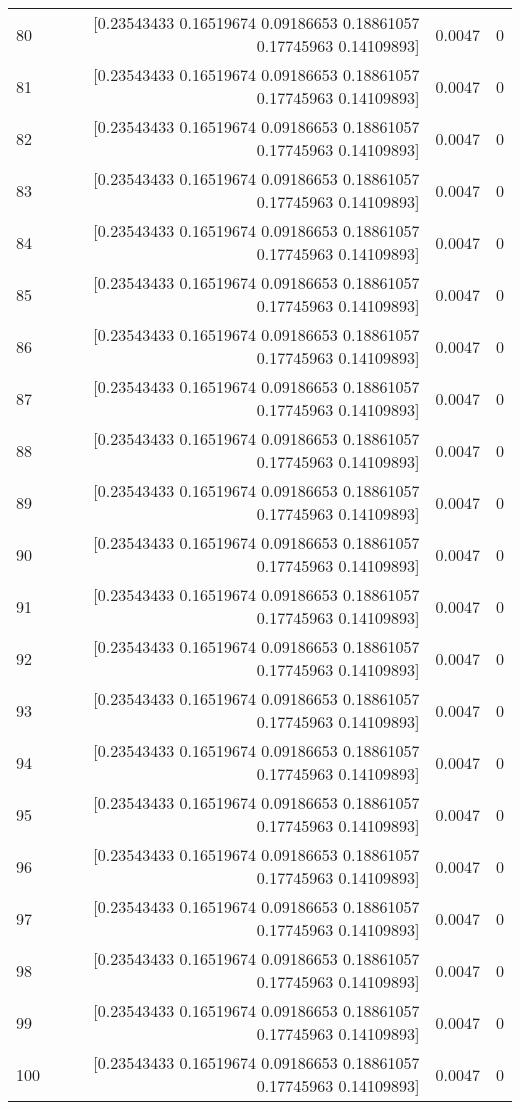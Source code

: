 \begin{longtable}{lrrr}
80 & [0.23543433 0.16519674 0.09186653 0.18861057 0.17745963 0.14109893] & 0.0047 & 0 \\
81 & [0.23543433 0.16519674 0.09186653 0.18861057 0.17745963 0.14109893] & 0.0047 & 0 \\
82 & [0.23543433 0.16519674 0.09186653 0.18861057 0.17745963 0.14109893] & 0.0047 & 0 \\
83 & [0.23543433 0.16519674 0.09186653 0.18861057 0.17745963 0.14109893] & 0.0047 & 0 \\
84 & [0.23543433 0.16519674 0.09186653 0.18861057 0.17745963 0.14109893] & 0.0047 & 0 \\
85 & [0.23543433 0.16519674 0.09186653 0.18861057 0.17745963 0.14109893] & 0.0047 & 0 \\
86 & [0.23543433 0.16519674 0.09186653 0.18861057 0.17745963 0.14109893] & 0.0047 & 0 \\
87 & [0.23543433 0.16519674 0.09186653 0.18861057 0.17745963 0.14109893] & 0.0047 & 0 \\
88 & [0.23543433 0.16519674 0.09186653 0.18861057 0.17745963 0.14109893] & 0.0047 & 0 \\
89 & [0.23543433 0.16519674 0.09186653 0.18861057 0.17745963 0.14109893] & 0.0047 & 0 \\
90 & [0.23543433 0.16519674 0.09186653 0.18861057 0.17745963 0.14109893] & 0.0047 & 0 \\
91 & [0.23543433 0.16519674 0.09186653 0.18861057 0.17745963 0.14109893] & 0.0047 & 0 \\
92 & [0.23543433 0.16519674 0.09186653 0.18861057 0.17745963 0.14109893] & 0.0047 & 0 \\
93 & [0.23543433 0.16519674 0.09186653 0.18861057 0.17745963 0.14109893] & 0.0047 & 0 \\
94 & [0.23543433 0.16519674 0.09186653 0.18861057 0.17745963 0.14109893] & 0.0047 & 0 \\
95 & [0.23543433 0.16519674 0.09186653 0.18861057 0.17745963 0.14109893] & 0.0047 & 0 \\
96 & [0.23543433 0.16519674 0.09186653 0.18861057 0.17745963 0.14109893] & 0.0047 & 0 \\
97 & [0.23543433 0.16519674 0.09186653 0.18861057 0.17745963 0.14109893] & 0.0047 & 0 \\
98 & [0.23543433 0.16519674 0.09186653 0.18861057 0.17745963 0.14109893] & 0.0047 & 0 \\
99 & [0.23543433 0.16519674 0.09186653 0.18861057 0.17745963 0.14109893] & 0.0047 & 0 \\
100 & [0.23543433 0.16519674 0.09186653 0.18861057 0.17745963 0.14109893] & 0.0047 & 0 \\

\end{longtable}
